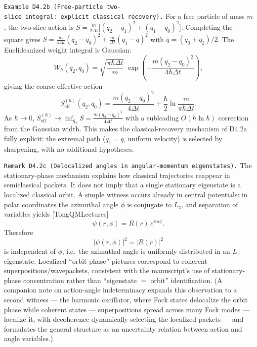 \documentclass[
]{article}
\begin{document}
\texttt{Example\ D4.2b\ (Free-particle\ two-slice\ integral:\ explicit\ classical\ recovery).}
For a free particle of mass \(m\), the two-slice action is
\(S=\frac{m}{2\Delta t}\bigl[(q_2-q_1)^2+(q_1-q_0)^2\bigr]\). Completing
the square gives
\(S=\frac{m}{4\Delta t}(q_2-q_0)^2+\frac{m}{\Delta t}(q_1-\bar q)^2\)
with \(\bar q=(q_0+q_2)/2\). The Euclideanized weight integral is
Gaussian: \[
W_\hbar(q_2,q_0)=\sqrt{\frac{\pi\hbar\Delta t}{m}}\;\exp\!\left(-\frac{m(q_2-q_0)^2}{4\hbar\Delta t}\right),
\] giving the coarse effective action \[
S_{\mathrm{eff}}^{(\hbar)}(q_2,q_0)=\frac{m(q_2-q_0)^2}{4\Delta t}+\frac\hbar2\ln\!\frac{m}{\pi\hbar\Delta t}.
\] As \(\hbar\to0\),
\(S_{\mathrm{eff}}^{(\hbar)}\to\inf_{q_1}S=\frac{m(q_2-q_0)^2}{4\Delta t}\)
with a subleading \(O(\hbar\ln\hbar)\) correction from the Gaussian
width. This makes the classical-recovery mechanism of D4.2a fully
explicit: the extremal path (\(q_1=\bar q\), uniform velocity) is
selected by sharpening, with no additional hypotheses.

\texttt{Remark\ D4.2c\ (Delocalized\ angles\ in\ angular-momentum\ eigenstates).}
The stationary-phase mechanism explains how classical trajectories
reappear in semiclassical packets. It does not imply that a single
stationary eigenstate is a localized classical orbit. A simple witness
occurs already in central potentials: in polar coordinates the azimuthal
angle \(\phi\) is conjugate to \(L_z\), and separation of variables
yields {[}TongQMLectures{]} \[
\psi(r,\phi)=R(r)\,e^{im\phi}.
\] Therefore \[
|\psi(r,\phi)|^2=|R(r)|^2
\] is independent of \(\phi\), i.e.~the azimuthal angle is uniformly
distributed in an \(L_z\) eigenstate. Localized ``orbit phase'' pictures
correspond to coherent superpositions/wavepackets, consistent with the
manuscript's use of stationary-phase concentration rather than
``eigenstate \(=\) orbit'' identification. (A companion note on
action-angle indeterminacy expands this observation to a second witness
--- the harmonic oscillator, where Fock states delocalize the orbit
phase while coherent states --- superpositions spread across many Fock
modes --- localize it, with decoherence dynamically selecting the
localized packets --- and formulates the general structure as an
uncertainty relation between action and angle variables.)
\end{document}
